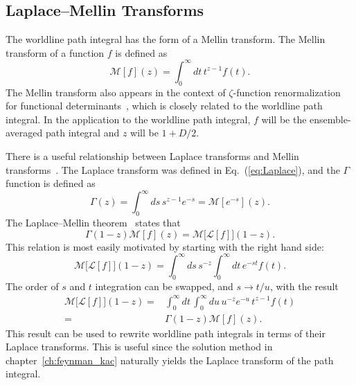 \subsection{ Laplace--Mellin Transforms}

The worldline path integral has the form of a Mellin transform.  
The Mellin transform of a function $f$ is defined as 
\begin{equation}
\mathcal{M}[f](z)= \int_0^\infty dt\, t^{z-1}f(t).
\end{equation}
The Mellin transform also appears in the context of $\zeta$-function renormalization for functional determinants~\citep{Elizalde2008},
which is closely related to the worldline path integral.  
In the application to the worldline path integral, $f$ will be the ensemble-averaged path integral and $z$ will be $1+D/2$.

There is a useful relationship between Laplace transforms and Mellin transforms~\citep{Lew1975}.  
The Laplace transform was defined in Eq.~(\ref{eq:Laplace}), and the $\Gamma$ function is defined as  
\begin{equation}
\Gamma(z) = \int_0^\infty ds\, s^{z-1} e^{-s} = \mathcal{M}[e^{-s}](z).
\end{equation}
The Laplace--Mellin theorem~\citep{Lew1975} states that
\begin{equation}
  \Gamma(1-z)\mathcal{M}[f](z) = \mathcal{M}\big[\mathcal{L}[f]\big](1-z)\label{eq:Laplace--Mellin}.
\end{equation}
This relation is most easily motivated by starting with the right hand side:
\begin{equation}
\mathcal{M}\big[\mathcal{L}[f]\big](1-z) = 
\int_0^\infty ds\, s^{-z} \int_0^\infty dt\,e^{-st} f(t).
\end{equation}
The order of $s$ and $t$ integration can be swapped, and  $s\rightarrow t/u$, with the 
result
\begin{align}
\mathcal{M}\big[\mathcal{L}[f]\big](1-z)=&\int_0^\infty dt\,\int_0^\infty du\, u^{-z} e^{-u}\,t^{z-1} f(t) \\
=& \Gamma(1-z)\mathcal{M}[f](z).
\end{align}
This result can be used to rewrite worldline path integrals in terms of their Laplace transforms. 
This is useful since the solution method in chapter~\ref{ch:feynman_kac} naturally yields the Laplace transform of the path integral.

